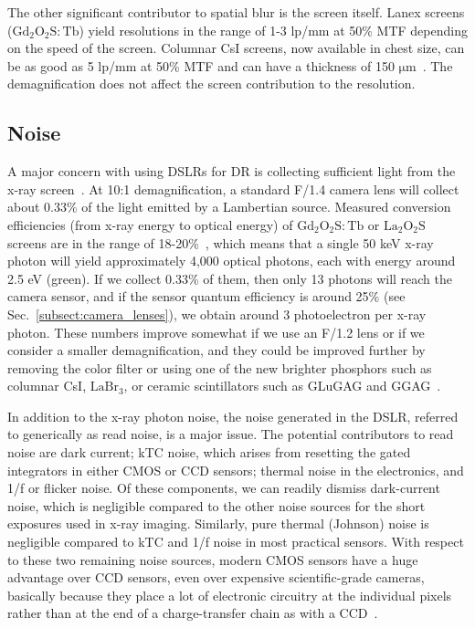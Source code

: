 The other significant contributor to spatial blur is the screen itself. Lanex screens ($\mathrm{Gd_2O_2S:Tb}$) yield resolutions in the range of 1-3 lp/mm at 50\% MTF depending on the speed of the screen. Columnar CsI screens, now available in chest size, can be as good as 5 lp/mm at 50\% MTF and can have a thickness of 150 $\mathrm{\mu m}$~\citep{Nagarkar1997}. The demagnification does not affect the screen contribution to the resolution.

\subsection{Noise}
\label{subsect:noise}
A major concern with using DSLRs for DR is collecting sufficient light from the x-ray screen~\citep{Hejazi1997}. At 10:1 demagnification, a standard F/1.4 camera lens will collect about 0.33\% of the light emitted by a Lambertian source. Measured conversion efficiencies (from x-ray energy to optical energy) of $\mathrm{Gd_2O_2S:Tb}$ or $\mathrm{La_2O_2S}$ screens are in the range of 18-20\%~\citep{Kandarakis2001}, which means that a single 50 keV x-ray photon will yield approximately 4,000 optical photons, each with energy around 2.5 eV (green). If we collect 0.33\% of them, then only 13 photons will reach the camera sensor, and if the sensor quantum efficiency is around 25\% (see Sec.~\ref{subsect:camera_lenses}), we obtain around 3 photoelectron per x-ray photon. These numbers improve somewhat if we use an F/1.2 lens or if we consider a smaller demagnification, and they could be improved further by removing the color filter or using one of the new brighter phosphors such as columnar CsI, $\mathrm{LaBr_3}$, or ceramic scintillators such as GLuGAG and GGAG~\citep{Wang2012, Cherepy2009}.

In addition to the x-ray photon noise, the noise generated in the DSLR, referred to generically as read noise, is a major issue. The potential contributors to read noise are dark current; kTC noise, which arises from resetting the gated integrators in either CMOS or CCD sensors; thermal noise in the electronics, and 1/f or flicker noise. Of these components, we can readily dismiss dark-current noise, which is negligible compared to the other noise sources for the short exposures used in x-ray imaging. Similarly, pure thermal (Johnson) noise is negligible compared to kTC and 1/f noise in most practical sensors. With respect to these two remaining noise sources, modern CMOS sensors have a huge advantage over CCD sensors, even over expensive scientific-grade cameras, basically because they place a lot of electronic circuitry at the individual pixels rather than at the end of a charge-transfer chain as with a CCD~\citep{Magnan2003}.

